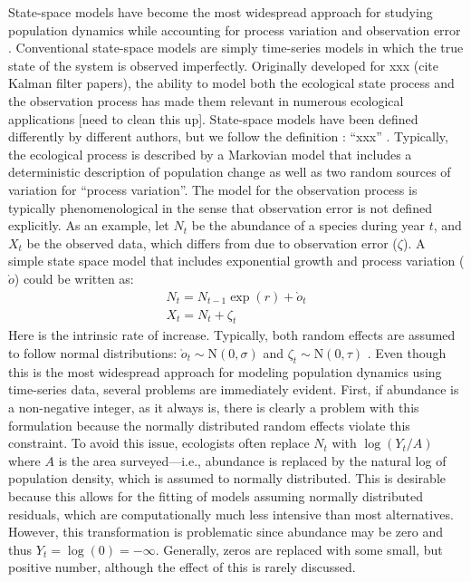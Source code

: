 \documentclass[12pt]{article}
\begin{document}
State-space models have become the most widespread approach for
studying population dynamics while accounting for process variation
and observation error \citep{devalpine_hastings:2002,
  buckland_etal:2004, dennis_taper:1994,
  dennis_etal:2006}. Conventional state-space models are
simply time-series models in which the true state of the system is
observed imperfectly. Originally developed for xxx (cite Kalman filter
papers), the ability to model both the ecological state process and
the observation process has made them relevant in numerous ecological
applications [need to clean this up]. State-space models have been
defined differently by different authors, but we follow
\citet{buckland_etal:2004} the definition : ``xxx'' . Typically, the
ecological
process is described by a Markovian model that includes a
deterministic description of population change as well as two random
sources of variation for ``process variation''. The model for the
observation process is typically phenomenological in the sense that
observation error is not defined explicitly. As an example, let $N_t$ be
the abundance of a species during year $t$, and $X_t$ be the observed data,
which differs from  due to observation error ($\zeta$). A simple state
space model that includes exponential growth and process variation
($\grave{o}$) could be written as:
\begin{gather}
N_t = N_{t-1}\exp(r)+\grave{o}_t \\
X_t = N_t + \zeta_t
\end{gather}
Here   is the intrinsic rate of increase. Typically, both random
effects are assumed to follow normal distributions: $\grave{o}_t \sim
\mathrm{N}(0, \sigma)$ and $\zeta_t \sim \mathrm{N}(0, \tau)$
\citep{devalpine_hastings:2002,dennis_etal:2006}. Even though this is
the most widespread approach for modeling population dynamics using
time-series data, several problems are immediately evident. First, if
abundance is a non-negative integer, as it always is, there is clearly
a problem with this formulation because the normally distributed
random effects violate this constraint. To avoid this issue,
ecologists often replace $N_t$ with $\log(Y_t/A)$   where $A$ is the
area surveyed---i.e.,
abundance is replaced by the natural log of population density, which
is assumed to normally distributed. This is desirable because this
allows for the fitting of models assuming normally distributed
residuals, which are computationally much less intensive than most
alternatives. However, this transformation is problematic since
abundance may be zero and thus $Y_t = \log(0) = -\infty$. Generally,
zeros are replaced with
some small, but positive number, although the effect of this is rarely
discussed.
\end{document}

